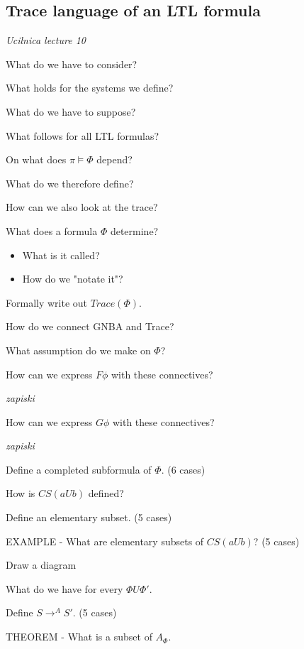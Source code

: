 \documentclass[fleqn]{article}
\begin{document}
\subsection{Trace language of an LTL formula}
\textit{Ucilnica lecture 10}
\begin{enumerate}
    {\color{red}\item What do we have to consider?}
    {\color{red}\item What holds for the systems we define?}
    {\color{green}\item What do we have to suppose?}
    {\color{green}\item What follows for all LTL formulas?}
    \item On what does $\pi \models \Phi$ depend?
    {\color{green}\item What do we therefore define?}
    {\color{green}\item How can we also look at the trace?}
    \item What does a formula $\Phi$ determine?
    \begin{itemize}
        \item What is it called?
        \item How do we "notate it"?
    \end{itemize}
    {\color{green}\item Formally write out $Trace(\Phi)$.}
    \item How do we connect GNBA and Trace?
    \item What assumption do we make on $\Phi$?
    {\color{blue}\item How can we express $F \phi$ with these connectives?} \textit{zapiski}
    {\color{blue}\item How can we express $G \phi$ with these connectives?} \textit{zapiski}
    {\color{green}\item Define a completed subformula of $\Phi$. (6 cases)}
    \item How is $CS(a U b) $ defined?
    {\color{green}\item Define an elementary subset. (5 cases)}
    \item EXAMPLE - What are elementary subsets of $CS(a U b)$? (5 cases)
    {\color{blue}\item Draw a diagram}
    {\color{green}\item What do we have for every $\Phi U \Phi'$.}
    {\color{green}\item Define $S \rightarrow^{A} S'$. (5 cases)}
    {\color{blue}\item THEOREM - What is a subset of $A_{\Phi}$.}
\end{enumerate}
\end{document}
